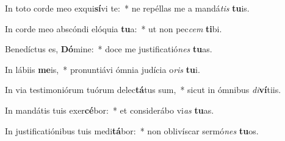 \item In toto corde meo exqui\textbf{sí}vi te:~* ne repéllas me a mandá\textit{tis} \textbf{tu}is.
\item In corde meo abscóndi elóquia \textbf{tu}a:~* ut non pec\textit{cem} \textbf{ti}bi.
\item Benedíctus es, \textbf{Dó}mine:~* doce me justificatió\textit{nes} \textbf{tu}as.
\item In lábiis \textbf{me}is,~* pronuntiávi ómnia judícia o\textit{ris} \textbf{tu}i.
\item In via testimoniórum tuórum delec\textbf{tá}tus sum,~* sicut in ómnibus \textit{di}\textbf{ví}tiis.
\item In mandátis tuis exer\textbf{cé}bor:~* et considerábo vi\textit{as} \textbf{tu}as.
\item In justificatiónibus tuis medi\textbf{tá}bor:~* non oblivíscar sermó\textit{nes} \textbf{tu}os.
